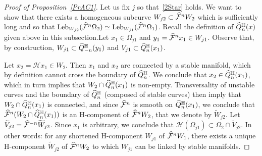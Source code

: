 \documentclass[10pt]{amsart}
\theoremstyle{definition}\newtheorem{defi}[theo]{Definition}\newtheorem{rema}[theo]{Remark}\newtheorem{exam}[theo]{Example}\newtheorem{exem}[theo]{Example}\newtheorem{nota}[theo]{Notation}
\newcommand{\cm}{\mathcal{F}}
\newcommand{\hol}{\mathcal{H}}
\newcommand{\cmp}{\hat\cm}
\newcommand{\tV}{\widetilde{V}}
\newcommand{\tW}{\widetilde{W}}
\newcommand{\cch}{\hat Q^{\mathbb{H}}}
\newcommand{\Leb}{\textup{Leb}}
\let\oldhat\hat
\renewcommand*{\hat}[1]{\mathchoice{\widehat{#1}}{\widehat{#1}}{\oldhat{#1}}{\oldhat{#1}}}
\begin{document}
\begin{proof}[Proof of Proposition~\ref{PrAC1}]
Let us fix $j$ so that~\eqref{2Star} holds. We want to show that there exists a homogeneous subcurve $W_{j2}\subset \cmp^n W_2$ which is sufficiently long and so that $\Leb_{W_{j2}}(\cmp^{n}\Omega_{2}) \simeq
\Leb_{W_{j1}}(\cmp^{n}\Omega_{1})$. Recall the definition of $\cch_n(x)$ given above in this subsection.\linebreak Let $x_{1}\in \Omega_{j1}$ and $y_{1} = \cmp^{n}x_{1}\in W_{j1}$. Observe that, by construction, $W_{j1}\subset \cch_{-n}(y_{1})$ and $V_{j1}\subset \cch_{n}(x_{1})$.


Let $x_{2} = \hol x_{1}\in W_{2}$. Then $x_{1}$ and $x_{2}$ are connected by a stable manifold, which by definition cannot cross the boundary of $\cch_{n}$. We conclude that $x_{2}\in \cch_{n}(x_{1})$, which in turn implies that $W_{2}\cap \cch_{n}(x_{1})$ is non-empty. Transversality of unstable curves and the boundary of $\cch_{n}$ (composed of stable curves) then imply that $W_{2}\cap \cch_{n}(x_{1})$ is connected, and since $\cmp^{n}$ is smooth on $\cch_{n}(x_{1})$, we conclude that $\cmp^{n}(W_{2}\cap \cch_{n}(x_{1}))$ is an H-component of $\cmp^{n}W_{2}$, that we denote by $\tW_{j2}$. Let $\tV_{j2} = \cmp^{-n}\tW_{j2}$. Since $x_{1}$ is arbitrary, we conclude that $\hol(\Omega_{j1}) \subset \Omega_{2}\cap \tV_{j2}$. In other words: for any shortened H-component $W_{j1}$ of $\cmp^{n}W_{1}$, there exists a unique H-component $\tW_{j2}$ of $\cmp^{n}W_{2}$ to which $W_{j1}$ can be linked by stable manifolds.


\end{proof}
\end{document}
